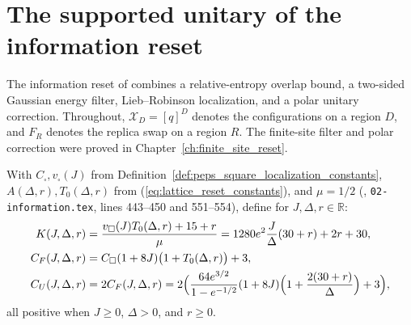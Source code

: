 \section{The supported unitary of the information reset}

The information reset of \cite{OpenAI2026PolynomialPEPS} combines a
relative-entropy overlap bound, a two-sided Gaussian energy filter,
Lieb--Robinson localization, and a polar unitary correction.
Throughout, $\mathcal X_D=[q]^D$ denotes the configurations on a region $D$,
and $F_R$ denotes the replica swap on a region $R$. The finite-site filter
and polar correction were proved in Chapter~\ref{ch:finite_site_reset}.

\begin{definition}
    \label{def:peps_reset_constants}
    \leanok
    With $C_\square,v_\square(J)$ from Definition~\ref{def:peps_square_localization_constants}, $A(\Delta,r),T_0(\Delta,r)$ from (\ref{eq:lattice_reset_constants}), and $\mu=1/2$ (\cite{OpenAI2026PolynomialPEPS}, \texttt{02-information.tex}, lines 443--450 and 551--554), define for $J,\Delta,r\in\mathbb R$:
    \begin{align}
        K(J,\Delta,r)   & =\frac{v_\square(J)T_0(\Delta,r)+15+r}{\mu} = 1280e^2\frac J\Delta(30+r)+2r+30, \notag                   \\
        C_F(J,\Delta,r) & =C_\square(1+8J)\bigl(1+T_0(\Delta,r)\bigr)+3, \notag                                                    \\
        C_U(J,\Delta,r) & =2C_F(J,\Delta,r) = 2\Bigl(\frac{64e^{3/2}}{1-e^{-1/2}}(1+8J)\Bigl(1+\frac{2(30+r)}\Delta\Bigr)+3\Bigr),
        \label{eq:peps_reset_constants}
    \end{align}
    all positive when $J\geq0$, $\Delta>0$, and $r\geq0$.
\end{definition}

